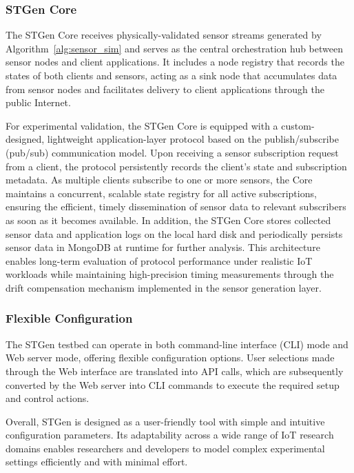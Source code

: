 \documentclass[jsan,article,submit,moreauthors,pdftex]{Definitions/mdpi}
\begin{document}
\subsubsection{STGen Core}
\label{STGen-core}

The STGen Core receives physically-validated sensor streams generated by Algorithm~\ref{alg:sensor_sim} and serves as the central orchestration hub between sensor nodes and client applications. It includes a node registry that records the states of both clients and sensors, acting as a sink node that accumulates data from sensor nodes and facilitates delivery to client applications through the public Internet. 

For experimental validation, the STGen Core is equipped with a custom-designed, lightweight application-layer protocol based on the publish/subscribe (pub/sub) communication model. Upon receiving a sensor subscription request from a client, the protocol persistently records the client's state and subscription metadata. As multiple clients subscribe to one or more sensors, the Core maintains a concurrent, scalable state registry for all active subscriptions, ensuring the efficient, timely dissemination of sensor data to relevant subscribers as soon as it becomes available. In addition, the STGen Core stores collected sensor data and application logs on the local hard disk and periodically persists sensor data in MongoDB \cite{plugge2015definitive} at runtime for further analysis. This architecture enables long-term evaluation of protocol performance under realistic {IoT} workloads while maintaining high-precision timing measurements through the drift compensation mechanism implemented in the sensor generation layer.

\subsubsection{Flexible Configuration}
\label{system-architect}
The STGen testbed can operate in both command-line interface (CLI) mode and Web server mode, offering flexible configuration options. User selections made through the Web interface are translated into API calls, which are subsequently converted by the Web server into CLI commands to execute the required setup and control actions.

Overall, STGen is designed as a user-friendly tool with simple and intuitive configuration parameters. Its adaptability across a wide range of {IoT} research domains enables researchers and developers to model complex experimental settings efficiently and with minimal effort.
\end{document}
